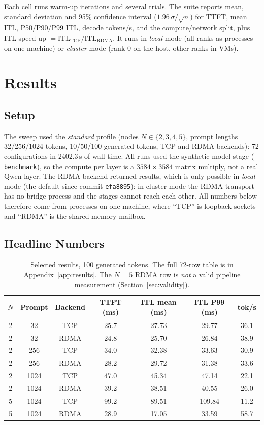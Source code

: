 \documentclass[11pt,a4paper]{article}
\begin{document}
Each cell runs warm-up iterations and several trials. The suite reports mean, standard deviation and 95\% confidence interval ($1.96\,\sigma/\sqrt{n}$) for TTFT, mean ITL, P50/P90/P99 ITL, decode tokens/s, and the compute/network split, plus ITL speed-up $= \text{ITL}_{\text{TCP}} / \text{ITL}_{\text{RDMA}}$. It runs in \emph{local} mode (all ranks as processes on one machine) or \emph{cluster} mode (rank 0 on the host, other ranks in VMs).

\section{Results}

\subsection{Setup}
The sweep used the \emph{standard} profile (nodes $N \in \{2,3,4,5\}$, prompt lengths 32/256/1024 tokens, 10/50/100 generated tokens, TCP and RDMA backends): 72 configurations in 2402.3\,s of wall time. All runs used the synthetic model stage (\texttt{--benchmark}), so the compute per layer is a $3584 \times 3584$ matrix multiply, not a real Qwen layer. The RDMA backend returned results, which is only possible in \emph{local} mode (the default since commit \texttt{efa8895}): in cluster mode the RDMA transport has no bridge process and the stages cannot reach each other. All numbers below therefore come from processes on one machine, where ``TCP'' is loopback sockets and ``RDMA'' is the shared-memory mailbox.

\subsection{Headline Numbers}
\begin{table}[h]
\centering
\small
\begin{tabular}{@{}ccccccc@{}}
\toprule
$N$ & Prompt & Backend & TTFT (ms) & ITL mean (ms) & ITL P99 (ms) & tok/s \\
\midrule
2 & 32   & TCP  & 25.7 & 27.73 & 29.77 & 36.1 \\
2 & 32   & RDMA & 24.8 & 25.70 & 26.84 & 38.9 \\
2 & 256  & TCP  & 34.0 & 32.38 & 33.63 & 30.9 \\
2 & 256  & RDMA & 28.2 & 29.72 & 31.38 & 33.6 \\
2 & 1024 & TCP  & 47.0 & 45.34 & 47.14 & 22.1 \\
2 & 1024 & RDMA & 39.2 & 38.51 & 40.55 & 26.0 \\
\midrule
5 & 1024 & TCP  & 99.2 & 89.51 & 109.84 & 11.2 \\
5 & 1024 & RDMA & 28.9 & 17.05 & 33.59  & 58.7 \\
\bottomrule
\end{tabular}
\caption{Selected results, 100 generated tokens. The full 72-row table is in Appendix~\ref{app:results}. The $N=5$ RDMA row is \emph{not} a valid pipeline measurement (Section~\ref{sec:validity}).}
\label{tab:headline}
\end{table}
\end{document}
